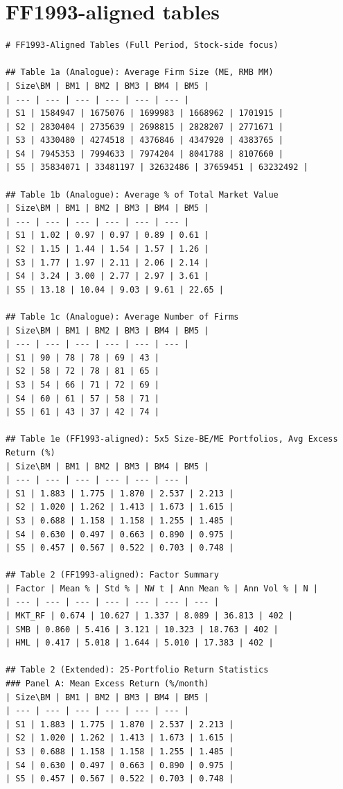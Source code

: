 \section*{FF1993-aligned tables}
\begin{verbatim}
# FF1993-Aligned Tables (Full Period, Stock-side focus)

## Table 1a (Analogue): Average Firm Size (ME, RMB MM)
| Size\BM | BM1 | BM2 | BM3 | BM4 | BM5 |
| --- | --- | --- | --- | --- | --- |
| S1 | 1584947 | 1675076 | 1699983 | 1668962 | 1701915 |
| S2 | 2830404 | 2735639 | 2698815 | 2828207 | 2771671 |
| S3 | 4330480 | 4274518 | 4376846 | 4347920 | 4383765 |
| S4 | 7945353 | 7994633 | 7974204 | 8041788 | 8107660 |
| S5 | 35834071 | 33481197 | 32632486 | 37659451 | 63232492 |

## Table 1b (Analogue): Average % of Total Market Value
| Size\BM | BM1 | BM2 | BM3 | BM4 | BM5 |
| --- | --- | --- | --- | --- | --- |
| S1 | 1.02 | 0.97 | 0.97 | 0.89 | 0.61 |
| S2 | 1.15 | 1.44 | 1.54 | 1.57 | 1.26 |
| S3 | 1.77 | 1.97 | 2.11 | 2.06 | 2.14 |
| S4 | 3.24 | 3.00 | 2.77 | 2.97 | 3.61 |
| S5 | 13.18 | 10.04 | 9.03 | 9.61 | 22.65 |

## Table 1c (Analogue): Average Number of Firms
| Size\BM | BM1 | BM2 | BM3 | BM4 | BM5 |
| --- | --- | --- | --- | --- | --- |
| S1 | 90 | 78 | 78 | 69 | 43 |
| S2 | 58 | 72 | 78 | 81 | 65 |
| S3 | 54 | 66 | 71 | 72 | 69 |
| S4 | 60 | 61 | 57 | 58 | 71 |
| S5 | 61 | 43 | 37 | 42 | 74 |

## Table 1e (FF1993-aligned): 5x5 Size-BE/ME Portfolios, Avg Excess Return (%)
| Size\BM | BM1 | BM2 | BM3 | BM4 | BM5 |
| --- | --- | --- | --- | --- | --- |
| S1 | 1.883 | 1.775 | 1.870 | 2.537 | 2.213 |
| S2 | 1.020 | 1.262 | 1.413 | 1.673 | 1.615 |
| S3 | 0.688 | 1.158 | 1.158 | 1.255 | 1.485 |
| S4 | 0.630 | 0.497 | 0.663 | 0.890 | 0.975 |
| S5 | 0.457 | 0.567 | 0.522 | 0.703 | 0.748 |

## Table 2 (FF1993-aligned): Factor Summary
| Factor | Mean % | Std % | NW t | Ann Mean % | Ann Vol % | N |
| --- | --- | --- | --- | --- | --- | --- |
| MKT_RF | 0.674 | 10.627 | 1.337 | 8.089 | 36.813 | 402 |
| SMB | 0.860 | 5.416 | 3.121 | 10.323 | 18.763 | 402 |
| HML | 0.417 | 5.018 | 1.644 | 5.010 | 17.383 | 402 |

## Table 2 (Extended): 25-Portfolio Return Statistics
### Panel A: Mean Excess Return (%/month)
| Size\BM | BM1 | BM2 | BM3 | BM4 | BM5 |
| --- | --- | --- | --- | --- | --- |
| S1 | 1.883 | 1.775 | 1.870 | 2.537 | 2.213 |
| S2 | 1.020 | 1.262 | 1.413 | 1.673 | 1.615 |
| S3 | 0.688 | 1.158 | 1.158 | 1.255 | 1.485 |
| S4 | 0.630 | 0.497 | 0.663 | 0.890 | 0.975 |
| S5 | 0.457 | 0.567 | 0.522 | 0.703 | 0.748 |


\end{verbatim}

